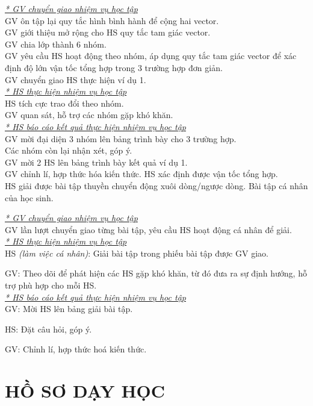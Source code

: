 {\textit{\underline{* GV chuyển giao nhiệm vụ học tập}}\\
	GV ôn tập lại quy tắc hình bình hành để cộng hai vector.\\
	GV giới thiệu mở rộng cho HS quy tắc tam giác vector.\\
	GV chia lớp thành 6 nhóm.\\
	GV yêu cầu HS hoạt động theo nhóm, áp dụng quy tắc tam giác vector để xác định độ lớn vận tốc tổng hợp trong 3 trường hợp đơn giản.\\
	GV chuyển giao HS thực hiện ví dụ 1.\\
	\textit{\underline{* HS thực hiện nhiệm vụ học tập}}\\
	HS tích cực trao đổi theo nhóm.\\
	GV quan sát, hỗ trợ các nhóm gặp khó khăn.\\
	\textit{\underline{* HS báo cáo kết quả thực hiện nhiệm vụ học tập}}\\
	GV mời đại diện 3 nhóm lên bảng trình bày cho 3 trường hợp.\\
	Các nhóm còn lại nhận xét, góp ý.
	\\
	GV mời 2 HS lên bảng trình bày kết quả ví dụ 1.
	\\
	GV chỉnh lí, hợp thức hóa kiến thức.
}
{
	HS xác định được vận tốc tổng hợp.\\
	HS giải được bài tập thuyền chuyển động xuôi dòng/ngược dòng.
}
{
	Bài tập cá nhân của học sinh.
}
{
	\textit{\underline{* GV chuyển giao nhiệm vụ học tập}}\\
	GV lần lượt chuyển giao từng bài tập, yêu cầu HS hoạt động cá nhân để giải.\\
	\textit{\underline{* HS thực hiện nhiệm vụ học tập}}\\
	HS \textit{(làm việc cá nhân)}:  Giải bài tập trong phiếu bài tập được GV giao. 
	
	GV: Theo dõi để phát hiện các HS gặp khó khăn, từ đó đưa ra sự định hướng, hỗ trợ phù hợp cho mỗi HS.\\
	\textit{\underline{* HS báo cáo kết quả thực hiện nhiệm vụ học tập}}\\
	GV: Mời HS lên bảng giải bài tập.
	
	HS: Đặt câu hỏi, góp ý.
	
	GV: Chỉnh lí, hợp thức hoá kiến thức.
}
\section{HỒ SƠ DẠY HỌC}
